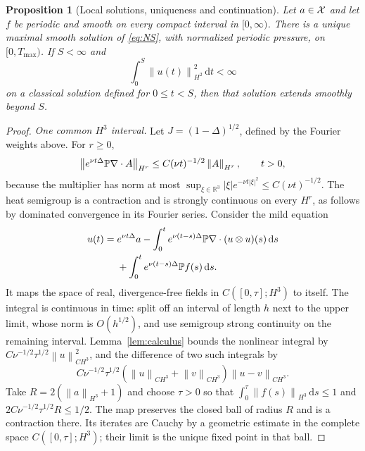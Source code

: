\documentclass[11pt,a4paper]{article}
\newtheorem{proposition}[theorem]{Proposition}
\theoremstyle{definition}\newtheorem{definition}[theorem]{Definition}
\theoremstyle{remark}\newtheorem{remark}[theorem]{Remark}
\newcommand{\R}{\mathbb R}\newcommand{\TT}{\mathbb T^3}
\newcommand{\dd}{\,\mathrm d}\newcommand{\eps}{\varepsilon}
\newcommand{\norm}[1]{\left\lVert#1\right\rVert}
\begin{document}
\begin{proposition}[Local solutions, uniqueness and continuation]\label{prop:local}
Let $a\in\mathcal X$ and let $f$ be periodic and smooth on every compact interval in $[0,\infty)$.
There is a unique maximal smooth solution of \eqref{eq:NS}, with normalized periodic pressure, on $[0,T_{\max})$.
If $S<\infty$ and
\begin{equation}\label{eq:criterion}
 \int_0^S\norm{u(t)}_{H^2}^2\dd t<\infty
\end{equation}
on a classical solution defined for $0\le t<S$, then that solution extends smoothly beyond $S$.
\end{proposition}
\begin{proof}
\emph{One common $H^3$ interval.}
Let $J=(1-\Delta)^{1/2}$, defined by the Fourier weights above. For $r\ge0$,
\[
 \norm{e^{\nu t\Delta}\PP\nabla\cdot A}_{H^r}
 \le C(\nu t)^{-1/2}\norm{A}_{H^r},\qquad t>0,
\]
because the multiplier has norm at most
$\sup_{\xi\in\R^3}|\xi|e^{-\nu t|\xi|^2}\le C(\nu t)^{-1/2}$.
The heat semigroup is a contraction and is strongly continuous on every
$H^r$, as follows by dominated convergence in its Fourier series.
Consider the mild equation
\begin{align}
 u(t)={}&e^{\nu t\Delta}a
 -\int_0^t e^{\nu(t-s)\Delta}\PP\nabla\cdot(u\otimes u)(s)\dd s \nonumber\\
 &+\int_0^t e^{\nu(t-s)\Delta}\PP f(s)\dd s.\label{eq:mild}
\end{align}
It maps the space of real, divergence-free fields in
$C([0,\tau];H^3)$ to itself. The integral is continuous in time: split off an
interval of length $h$ next to the upper limit, whose norm is $O(h^{1/2})$,
and use semigroup strong continuity on the remaining interval.
Lemma~\ref{lem:calculus} bounds the nonlinear integral by
$C\nu^{-1/2}\tau^{1/2}\norm{u}_{C H^3}^2$, and the difference of two such
integrals by
\[
 C\nu^{-1/2}\tau^{1/2}
 (\norm{u}_{C H^3}+\norm{v}_{C H^3})\norm{u-v}_{C H^3}.
\]
Take $R=2(\norm{a}_{H^3}+1)$ and choose $\tau>0$ so that
$\int_0^\tau\norm{f(s)}_{H^3}\dd s\le1$ and
$2C\nu^{-1/2}\tau^{1/2}R\le1/2$.
The map preserves the closed ball of radius $R$ and is a contraction there.
Its iterates are Cauchy by a geometric estimate in the complete space
$C([0,\tau];H^3)$; their limit is the unique fixed point in that ball.


\end{proof}
\end{document}
